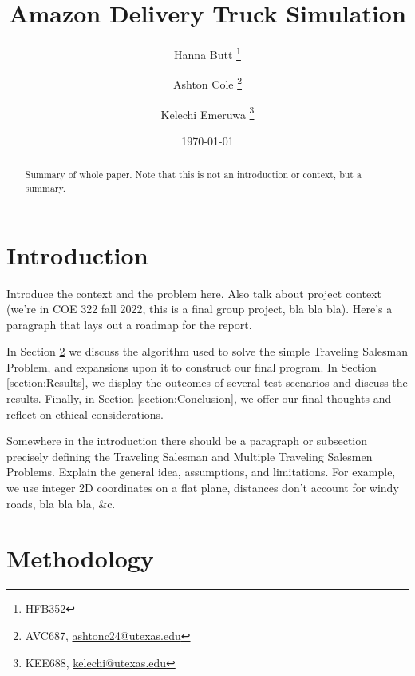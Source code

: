 \documentclass[letterpaper]{article}
\title{Amazon Delivery Truck Simulation}
\author{Hanna Butt \thanks{HFB352} \and Ashton Cole \thanks{AVC687, \href{mailto:ashtonc24@utexas.edu}{ashtonc24@utexas.edu}} \and Kelechi Emeruwa \thanks{KEE688, \href{mailto:kelechi@utexas.edu}{kelechi@utexas.edu}}}
\date{\today}
\begin{document}
    \maketitle

    \begin{abstract}
        Summary of whole paper. Note that this is not an introduction or context, but a summary.
    \end{abstract}

    \section{Introduction}
    \label{section:Introduction}
    Introduce the context and the problem here. Also talk about project context (we're in COE 322 fall 2022, this is a final group project, bla bla bla). Here's a paragraph that lays out a roadmap for the report.
    
    In Section \ref{section:Methodology} we discuss the algorithm used to solve the simple Traveling Salesman Problem, and expansions upon it to construct our final program. In Section \ref{section:Results}, we display the outcomes of several test scenarios and discuss the results. Finally, in Section \ref{section:Conclusion}, we offer our final thoughts and reflect on ethical considerations.

    Somewhere in the introduction there should be a paragraph or subsection precisely defining the Traveling Salesman and Multiple Traveling Salesmen Problems. Explain the general idea, assumptions, and limitations. For example, we use integer 2D coordinates on a flat plane, distances don't account for windy roads, bla bla bla, \&c.

    \section{Methodology}
    \label{section:Methodology}
\end{document}

